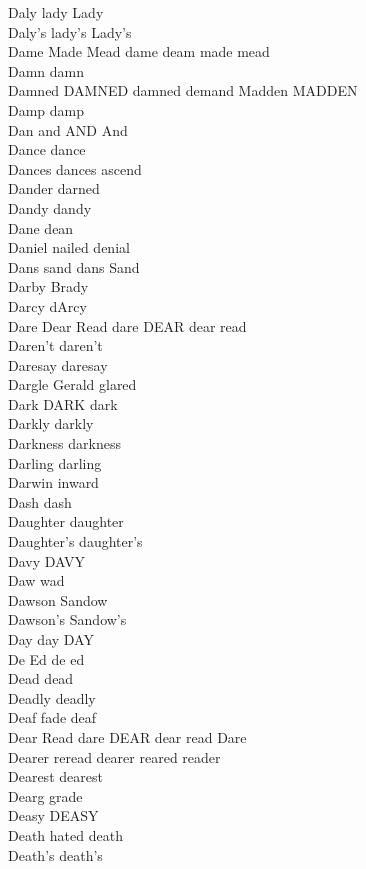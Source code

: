 Daly lady Lady\\
Daly's lady's Lady's\\
Dame Made Mead dame deam made mead\\
Damn damn\\
Damned DAMNED damned demand Madden MADDEN\\
Damp damp\\
Dan and AND And\\
Dance dance\\
Dances dances ascend\\
Dander darned\\
Dandy dandy\\
Dane dean\\
Daniel nailed denial\\
Dans sand dans Sand\\
Darby Brady\\
Darcy dArcy\\
Dare Dear Read dare DEAR dear read\\
Daren't daren't\\
Daresay daresay\\
Dargle Gerald glared\\
Dark DARK dark\\
Darkly darkly\\
Darkness darkness\\
Darling darling\\
Darwin inward\\
Dash dash\\
Daughter daughter\\
Daughter's daughter's\\
Davy DAVY\\
Daw wad\\
Dawson Sandow\\
Dawson's Sandow's\\
Day day DAY\\
De Ed de ed\\
Dead dead\\
Deadly deadly\\
Deaf fade deaf\\
Dear Read dare DEAR dear read Dare\\
Dearer reread dearer reared reader\\
Dearest dearest\\
Dearg grade\\
Deasy DEASY\\
Death hated death\\
Death's death's\\
